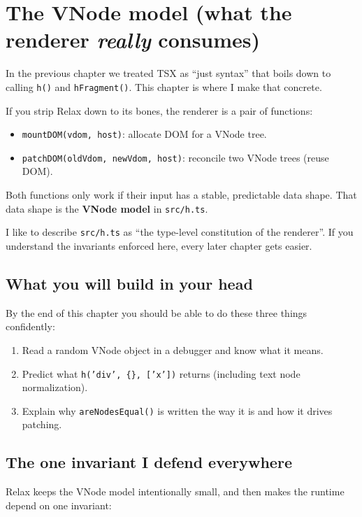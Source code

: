 \chapter{The VNode model (what the renderer \emph{really} consumes)}
\label{ch:vnode-model}

In the previous chapter we treated TSX as ``just syntax'' that boils down to calling \texttt{h()} and \texttt{hFragment()}.
This chapter is where I make that concrete.

If you strip Relax down to its bones, the renderer is a pair of functions:

\begin{itemize}
  \item \texttt{mountDOM(vdom, host)}: allocate DOM for a VNode tree.
  \item \texttt{patchDOM(oldVdom, newVdom, host)}: reconcile two VNode trees (reuse DOM).
\end{itemize}

Both functions only work if their input has a stable, predictable data shape.
That data shape is the \textbf{VNode model} in \texttt{src/h.ts}.

I like to describe \texttt{src/h.ts} as ``the type-level constitution of the renderer''.
If you understand the invariants enforced here, every later chapter gets easier.

\section{What you will build in your head}
By the end of this chapter you should be able to do these three things confidently:

\begin{enumerate}
  \item Read a random VNode object in a debugger and know what it means.
  \item Predict what \texttt{h('div', \{\}, ['x'])} returns (including text node normalization).
  \item Explain why \texttt{areNodesEqual()} is written the way it is and how it drives patching.
\end{enumerate}

\section{The one invariant I defend everywhere}
Relax keeps the VNode model intentionally small, and then makes the runtime depend on one invariant:

